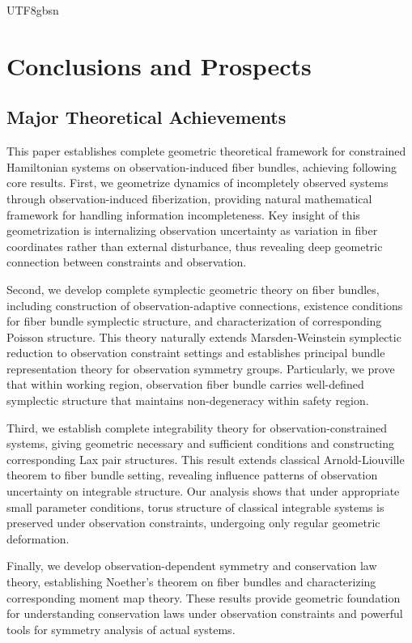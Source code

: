 \documentclass[a4paper,12pt]{extarticle}
\theoremstyle{definition}
\begin{document}
\begin{CJK}{UTF8}{gbsn}
\section{Conclusions and Prospects}

\subsection{Major Theoretical Achievements}

This paper establishes complete geometric theoretical framework for constrained Hamiltonian systems on observation-induced fiber bundles, achieving following core results. First, we geometrize dynamics of incompletely observed systems through observation-induced fiberization, providing natural mathematical framework for handling information incompleteness. Key insight of this geometrization is internalizing observation uncertainty as variation in fiber coordinates rather than external disturbance, thus revealing deep geometric connection between constraints and observation.

Second, we develop complete symplectic geometric theory on fiber bundles, including construction of observation-adaptive connections, existence conditions for fiber bundle symplectic structure, and characterization of corresponding Poisson structure. This theory naturally extends Marsden-Weinstein symplectic reduction to observation constraint settings and establishes principal bundle representation theory for observation symmetry groups. Particularly, we prove that within working region, observation fiber bundle carries well-defined symplectic structure that maintains non-degeneracy within safety region.

Third, we establish complete integrability theory for observation-constrained systems, giving geometric necessary and sufficient conditions and constructing corresponding Lax pair structures. This result extends classical Arnold-Liouville theorem to fiber bundle setting, revealing influence patterns of observation uncertainty on integrable structure. Our analysis shows that under appropriate small parameter conditions, torus structure of classical integrable systems is preserved under observation constraints, undergoing only regular geometric deformation.

Finally, we develop observation-dependent symmetry and conservation law theory, establishing Noether's theorem on fiber bundles and characterizing corresponding moment map theory. These results provide geometric foundation for understanding conservation laws under observation constraints and powerful tools for symmetry analysis of actual systems.


\end{CJK}
\end{document}
